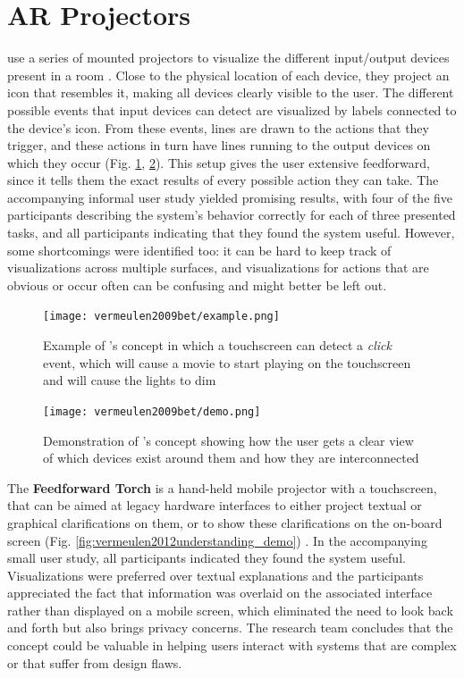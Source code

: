 \section{AR Projectors} \label{sec:relat:ar_projectors}
\textbf{\citeauthor{vermeulen2009bet}} use a series of mounted projectors to visualize the different input/output devices present in a room \cite{vermeulen2009bet}. Close to the physical location of each device, they project an icon that resembles it, making all devices clearly visible to the user. The different possible events that input devices can detect are visualized by labels connected to the device's icon. From these events, lines are drawn to the actions that they trigger, and these actions in turn have lines running to the output devices on which they occur (Fig. \ref{fig:vermeulen2009bet_mockup}, \ref{fig:vermeulen2009bet_demo}). This setup gives the user extensive feedforward, since it tells them the exact results of every possible action they can take. The accompanying informal user study yielded promising results, with four of the five participants describing the system's behavior correctly for each of three presented tasks, and all participants indicating that they found the system useful. However, some shortcomings were identified too: it can be hard to keep track of visualizations across multiple surfaces, and visualizations for actions that are obvious or occur often can be confusing and might better be left out.

\begin{figure}
    \centering
    \texttt{[image: vermeulen2009bet/example.png]}
    \caption{Example of \textbf{\citeauthor{vermeulen2009bet}}'s concept in which a touchscreen can detect a \textit{click} event, which will cause a movie to start playing on the touchscreen and will cause the lights to dim \cite{vermeulen2009bet}}
    \label{fig:vermeulen2009bet_mockup}
\end{figure}

\begin{figure}
    \centering
    \texttt{[image: vermeulen2009bet/demo.png]}
    \caption{Demonstration of \textbf{\citeauthor{vermeulen2009bet}}'s concept showing how the user gets a clear view of which devices exist around them and how they are interconnected \cite{vermeulen2009bet}}
    \label{fig:vermeulen2009bet_demo}
\end{figure}

The \textbf{Feedforward Torch} is a hand-held mobile projector with a touchscreen, that can be aimed at legacy hardware interfaces to either project textual or graphical clarifications on them, or to show these clarifications on the on-board screen (Fig. \ref{fig:vermeulen2012understanding_demo}) \cite{vermeulen2012understanding}. In the accompanying small user study, all participants indicated they found the system useful. Visualizations were preferred over textual explanations and the participants appreciated the fact that information was overlaid on the associated interface rather than displayed on a mobile screen, which eliminated the need to look back and forth but also brings privacy concerns. The research team concludes that the concept could be valuable in helping users interact with systems that are complex or that suffer from design flaws.

